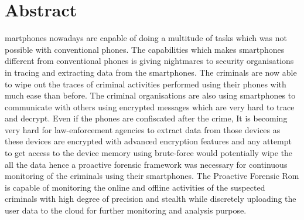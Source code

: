 %
%
%

\chapter*{Abstract}
\begin{SingleSpace}
martphones nowadays are capable of doing a multitude of tasks which was not possible with conventional phones. The capabilities which makes smartphones different from conventional phones is giving nightmares to security organisations in tracing and extracting data from the smartphones.  The criminals are now  able to wipe out the traces of criminal activities performed using their phones with much ease than before.  The criminal organisations are also using smartphones to communicate with others using encrypted messages which are very hard to trace and decrypt.  Even if the phones are confiscated after the crime, It is becoming very hard for law-enforcement agencies to extract data from those devices as these devices are encrypted with advanced encryption features and any attempt to get access to the device memory using brute-force would potentially wipe the all the data hence a proactive forensic framework was necessary for continuous monitoring of the criminals using their smartphones. The Proactive Forensic Rom is capable of monitoring the  online and offline activities of the suspected criminals with high degree of precision and stealth while discretely uploading the user data to the cloud for further monitoring and analysis purpose.
\end{SingleSpace}
\clearpage